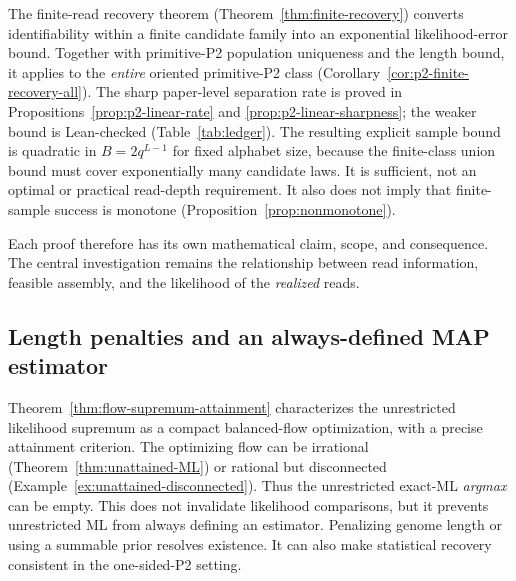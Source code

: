 The finite-read recovery theorem
(Theorem~\ref{thm:finite-recovery}) converts identifiability
within a finite candidate family into an exponential
likelihood-error bound. Together with primitive-P2
population uniqueness and the length bound, it applies
to the \emph{entire} oriented primitive-P2 class
(Corollary~\ref{cor:p2-finite-recovery-all}).
The sharp paper-level separation rate is proved in
Propositions~\ref{prop:p2-linear-rate} and
\ref{prop:p2-linear-sharpness}; the weaker bound is
Lean-checked (Table~\ref{tab:ledger}).
The resulting explicit sample bound is quadratic in
$B=2q^{L-1}$ for fixed alphabet size, because the
finite-class union bound must cover exponentially many
candidate laws. It is sufficient, not an optimal
or practical read-depth requirement. It also does not
imply that finite-sample success is monotone
(Proposition~\ref{prop:nonmonotone}).

Each proof therefore has its own mathematical claim, scope,
and consequence. The central investigation remains the
relationship between read information, feasible assembly,
and the likelihood of the \emph{realized} reads.


\subsection{Length penalties and an always-defined MAP estimator}
\label{sec:map-length}

Theorem~\ref{thm:flow-supremum-attainment}
characterizes the unrestricted likelihood supremum
as a compact balanced-flow optimization, with a
precise attainment criterion. The optimizing flow
can be irrational (Theorem~\ref{thm:unattained-ML})
or rational but disconnected
(Example~\ref{ex:unattained-disconnected}).
Thus the unrestricted exact-ML \emph{argmax} can be empty. This
does not invalidate likelihood comparisons, but it prevents
unrestricted ML from always defining an estimator. Penalizing
genome length or using a summable prior resolves existence.
It can also make statistical recovery consistent in the
one-sided-P2 setting.

